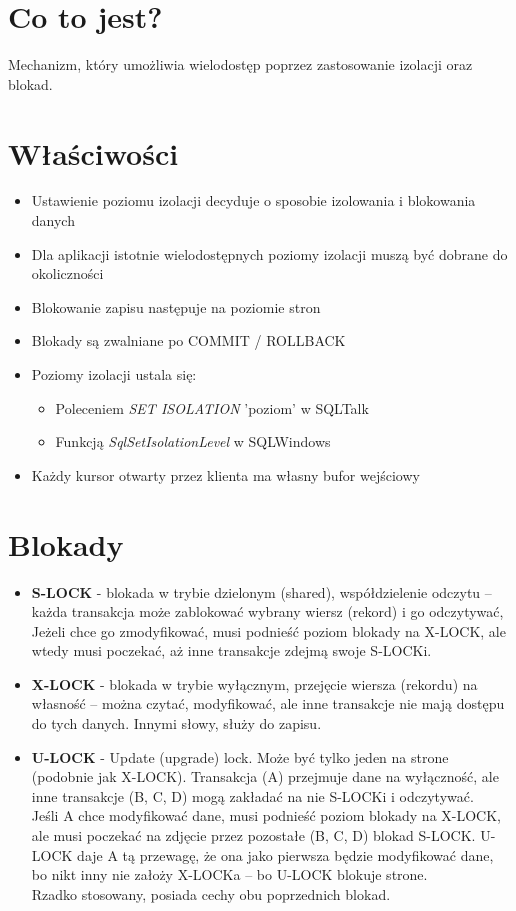 \documentclass[a4paper,twoside]{article}
\begin{document}
  	\section*{Co to jest?}
  	Mechanizm, który umożliwia wielodostęp poprzez zastosowanie izolacji oraz blokad.
  	
  	\section*{Właściwości}
  	\begin{itemize}
  		\item Ustawienie poziomu izolacji decyduje o sposobie izolowania i blokowania danych 
  		\item Dla aplikacji istotnie wielodostępnych poziomy izolacji muszą być dobrane do okoliczności 
  		\item Blokowanie zapisu następuje na poziomie stron 
  		\item Blokady są zwalniane po COMMIT / ROLLBACK 
  		\item Poziomy izolacji ustala się:
  		\begin{itemize}
  			\item Poleceniem \emph{SET ISOLATION} 'poziom' w SQLTalk 
  			\item Funkcją \emph{SqlSetIsolationLevel} w SQLWindows
  		\end{itemize}
  		\item Każdy kursor otwarty przez klienta ma własny bufor wejściowy
  	\end{itemize}
  	
  	\section*{Blokady}				
  	\begin{itemize}
  		\item \textbf{S-LOCK} - blokada w trybie dzielonym (shared), współdzielenie odczytu – każda transakcja może zablokować wybrany wiersz (rekord) i go odczytywać, Jeżeli chce go zmodyfikować, musi podnieść poziom blokady na X-LOCK, ale wtedy musi poczekać, aż inne transakcje zdejmą swoje S-LOCKi.
  		\item \textbf{X-LOCK} - blokada w trybie wyłącznym, przejęcie wiersza (rekordu) na własność – można czytać, modyfikować, ale inne transakcje nie mają dostępu do tych danych. Innymi słowy, służy do zapisu.
  		\item \textbf{U-LOCK} - Update (upgrade) lock. Może być tylko jeden na strone (podobnie jak X-LOCK). Transakcja (A) przejmuje dane na wyłączność, ale inne transakcje (B, C, D) mogą zakładać na nie S-LOCKi i odczytywać. \\ Jeśli A chce modyfikować dane, musi podnieść poziom blokady na X-LOCK, ale musi poczekać na zdjęcie przez pozostałe (B, C, D) blokad S-LOCK. U-LOCK daje A tą przewagę, że ona jako pierwsza będzie modyfikować dane, bo nikt inny nie założy X-LOCKa – bo U-LOCK blokuje strone. \\ Rzadko stosowany, posiada cechy obu poprzednich blokad.
  	\end{itemize}
  	
\end{document}
